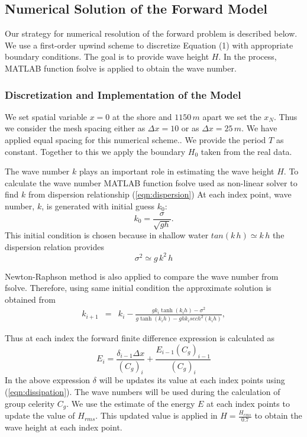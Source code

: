 \subsection{Numerical Solution of the Forward Model}
Our strategy for numerical resolution of the forward problem is described below.  We use a first-order upwind scheme to discretize Equation (1) with appropriate boundary conditions. The goal is to provide wave height ${H}$. In the process, MATLAB function fsolve is applied to obtain the wave number.

\subsubsection{Discretization and Implementation of the Model}
We set spatial variable $x=0$ at the shore and ${1150\,m}$ apart we set the ${x_{N}}$. Thus we consider the mesh spacing either as ${\Delta x=10}$ or as ${\Delta x=25\,m}$. We have applied equal spacing for this numerical scheme.. We provide the period ${T}$ as constant. Together to this we apply the boundary ${H_0}$ taken from the real data. 

The wave number ${k}$ plays an important role in estimating the wave height ${H}$. To calculate the wave number MATLAB function fsolve used as non-linear solver to find ${k}$ from dispersion relationship (\ref{eqn:dispersion})
At each index point, wave number, $k$, is generated with initial guess $k_0$:
$$k_0=\frac{\sigma}{\sqrt{gh}}.$$
This initial condition is chosen because in shallow water ${tan(k\,h)\simeq k\,h}$ the dispersion relation provides \\
$${\sigma^2\simeq g\,k^2\,h}$$

Newton-Raphson method is also applied to compare the wave number from fsolve. Therefore, using same initial condition the approximate solution is obtained from
\begin{eqnarray}
k_{i+1}& =& k_{i}-\frac{gk_i\tanh(k_ih)-\sigma^2}{g\tanh(k_ih)-ghk_i sech^2(k_ih)},
\end{eqnarray}


Thus at each index the forward finite difference expression is calculated as
$$E_{i}=\frac{\delta_{i-1}\Delta x}{(C_g)_{i}}+\frac{E_{i-1}(C_g)_{i-1}}{(C_g)_{i}}$$
In the above expression ${\delta}$ will be updates its value at each index points using (\ref{eqn:dissipation}). The wave numbers will be used during the calculation of group celerity ${C_{g}}$. We use the estimate of the energy ${E}$ at each index points to update the value of ${H_{rms}}$. This updated value is applied in ${H=\frac{H_{rms}}{0.7}}$ to obtain the wave height at each index point. 



